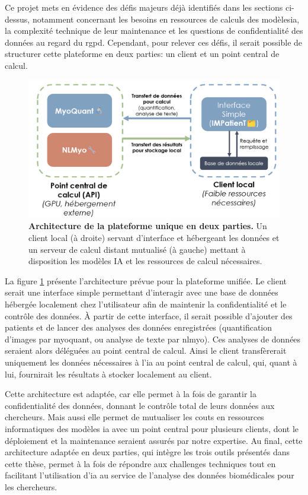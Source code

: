 Ce projet mets en évidence des défis majeurs déjà identifiés dans les sections ci-dessus, notamment concernant les besoins en ressources de calculs des modèles\gls{ia}, la complexité technique de leur maintenance et les questions de confidentialité des données au regard du \gls{rgpd}. Cependant, pour relever ces défis, il serait possible de structurer cette plateforme en deux parties: un client et un point central de calcul.
 \begin{figure}[!ht]
 \centering
 \includegraphics[width=1\textwidth]{figures/perspective_unique.png}
 \caption[Architecture de la plateforme unique en deux parties]{\textbf{Architecture de la plateforme unique en deux parties.} Un client local (à droite) servant d'interface et hébergeant les données et un serveur de calcul distant mutualisé  (à gauche) mettant à disposition les modèles IA et les ressources de calcul nécessaires.}
 \label{fig:perspective_unique}
\end{figure}

La figure \ref{fig:perspective_unique} présente l'architecture prévue pour la plateforme unifiée. Le client serait une interface simple permettant d'interagir avec une base de données hébergée localement chez l'utilisateur afin de maintenir la confidentialité et le contrôle des données. À partir de cette interface, il serait possible d'ajouter des patients et de lancer des analyses des données enregistrées (quantification d'images par \gls{myoquant}, ou analyse de texte par \gls{nlmyo}). Ces analyses de données seraient alors déléguées au point central de calcul. Ainsi le client transfèrerait uniquement les données nécessaires à l'\gls{ia} au point central de calcul, qui, quant à lui, fournirait les résultats à stocker localement au client.

Cette architecture est adaptée, car elle permet à la fois de garantir la confidentialité des données, donnant le contrôle total de leurs données aux chercheurs. Mais aussi elle permet de mutualiser les couts en ressources informatiques des modèles \gls{ia} avec un point central pour plusieurs clients, dont le déploiement et la maintenance seraient assurés par notre expertise. Au final, cette architecture adaptée en deux parties, qui intègre les trois outils présentés dans cette thèse, permet à la fois de répondre aux challenges techniques tout en facilitant l'utilisation d'\gls{ia} au service de l'analyse des données biomédicales pour les chercheurs.
